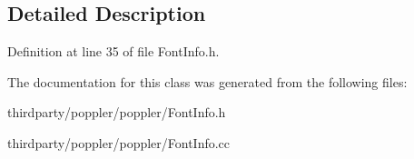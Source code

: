 \subsection{Detailed Description}


Definition at line 35 of file Font\+Info.\+h.



The documentation for this class was generated from the following files\+:\begin{DoxyCompactItemize}
\item 
thirdparty/poppler/poppler/Font\+Info.\+h\item 
thirdparty/poppler/poppler/Font\+Info.\+cc\end{DoxyCompactItemize}
